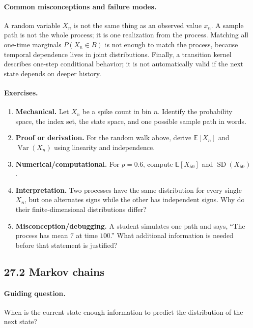 \paragraph{Common misconceptions and failure modes.}
A random variable \(X_n\) is not the same thing as an observed value \(x_n\). A sample path is not the whole process; it is one realization from the process. Matching all one-time marginals \(P(X_n\in B)\) is not enough to match the process, because temporal dependence lives in joint distributions. Finally, a transition kernel describes one-step conditional behavior; it is not automatically valid if the next state depends on deeper history.

\paragraph{Exercises.}
\begin{enumerate}[label=\textbf{27.1.\arabic*.}, leftmargin=*]
\item \textbf{Mechanical.} Let \(X_n\) be a spike count in bin \(n\). Identify the probability space, the index set, the state space, and one possible sample path in words.
\item \textbf{Proof or derivation.} For the random walk above, derive \(\mathbb E[X_n]\) and \(\operatorname{Var}(X_n)\) using linearity and independence.
\item \textbf{Numerical/computational.} For \(p=0.6\), compute \(\mathbb E[X_{50}]\) and \(\operatorname{SD}(X_{50})\).
\item \textbf{Interpretation.} Two processes have the same distribution for every single \(X_n\), but one alternates signs while the other has independent signs. Why do their finite-dimensional distributions differ?
\item \textbf{Misconception/debugging.} A student simulates one path and says, ``The process has mean \(7\) at time \(100\).'' What additional information is needed before that statement is justified?
\end{enumerate}

\subsection{27.2 Markov chains}

\paragraph{Guiding question.}
When is the current state enough information to predict the distribution of the next state?

